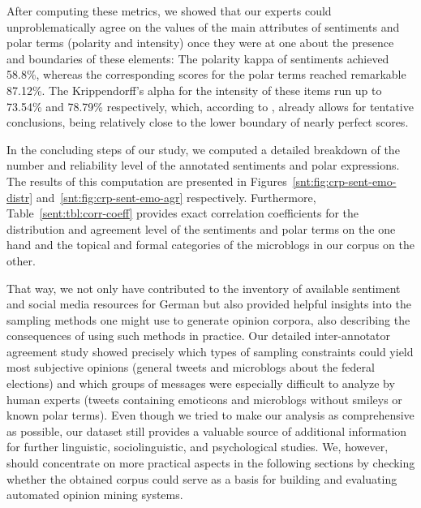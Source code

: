 After computing these metrics, we showed that our experts could
unproblematically agree on the values of the main attributes of
sentiments and polar terms (polarity and intensity) once
they were at one about the presence and boundaries of these elements:
The polarity kappa of sentiments achieved 58.8\%, whereas the
corresponding scores for the polar terms reached remarkable 87.12\%.
The Krippendorff's alpha for the intensity of these items run up to
73.54\% and 78.79\% respectively, which, according to
\citet{Krippendorff:07}, already allows for tentative conclusions,
being relatively close to the lower boundary of nearly perfect scores.

In the concluding steps of our study, we computed a detailed breakdown
of the number and reliability level of the annotated sentiments and
polar expressions.  The results of this computation are presented in
Figures~\ref{snt:fig:crp-sent-emo-distr}
and~\ref{snt:fig:crp-sent-emo-agr} respectively.  Furthermore,
Table~\ref{sent:tbl:corr-coeff} provides exact correlation
coefficients for the distribution and agreement level of the
sentiments and polar terms on the one hand and the topical and formal
categories of the microblogs in our corpus on the other.

That way, we not only have contributed to the inventory of available
sentiment and social media resources for German but also provided
helpful insights into the sampling methods one might use to generate
opinion corpora, also describing the consequences of using such
methods in practice.  Our detailed inter-annotator agreement study
showed precisely which types of sampling constraints could yield most
subjective opinions (general tweets and microblogs about the federal
elections) and which groups of messages were especially difficult to
analyze by human experts (tweets containing emoticons and microblogs
without smileys or known polar terms).  Even though we tried to make
our analysis as comprehensive as possible, our dataset still provides
a valuable source of additional information for further linguistic,
sociolinguistic, and psychological studies.  We, however, should
concentrate on more practical aspects in the following sections by
checking whether the obtained corpus could serve as a basis for
building and evaluating automated opinion mining systems.
